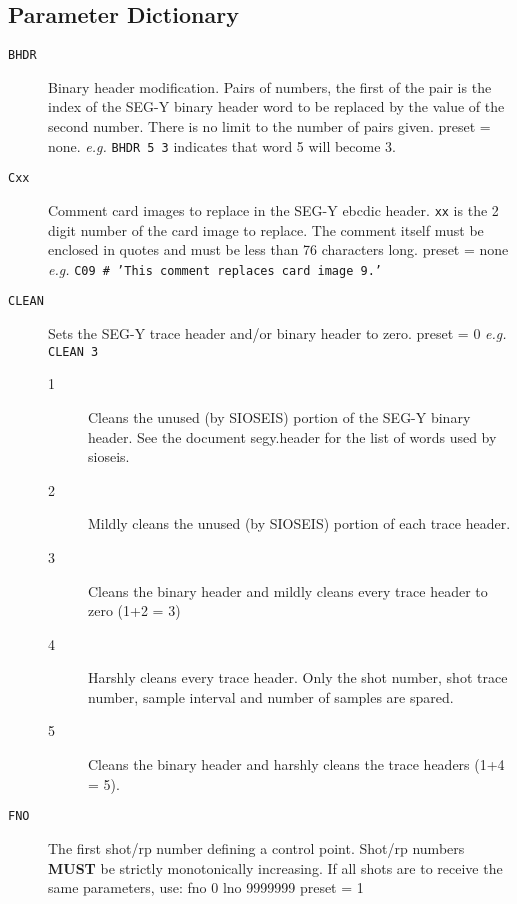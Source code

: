 \subsection{Parameter Dictionary}

\begin{description}
\item[\texttt{BHDR}] Binary header modification.  Pairs of numbers, the first of
         the pair is the index of the SEG-Y binary header word to be
         replaced by the value of the second number.  There is no
         limit to the number of pairs given.
         \Gls{preset} = none.  \textit{e.g.} \texttt{BHDR 5 3}   indicates that word 5 will become 3.

\item[\texttt{Cxx}] Comment card images to replace in the SEG-Y \gls{ebcdic} header.  \texttt{xx}
         is the 2 digit number of the card image to replace.   The
         comment itself must be enclosed in quotes and must be less than
         76 characters long.
         \Gls{preset} = none   \textit{e.g.} \texttt{C09 \# 'This comment replaces card image 9.'}

\item[\texttt{CLEAN}] Sets the SEG-Y trace header and/or binary header to zero.
         \Gls{preset} = 0  \textit{e.g.} \texttt{CLEAN 3}
\begin{description}
       \item[1] Cleans the unused (by SIOSEIS) portion of the SEG-Y binary
           header.  See the document segy.header for the list of
           words used by sioseis.
       \item[2] Mildly cleans the unused (by SIOSEIS) portion of each
           trace header.
       \item[3] Cleans the binary header and mildly cleans every trace
           header to zero (1+2 = 3)
       \item[4] Harshly cleans every trace header.  Only the \gls{shot} number,
           \gls{shot} trace number, sample interval and number of samples
           are spared.
       \item[5] Cleans the binary header and harshly cleans the trace
           headers (1+4 = 5).
\end{description}

\item[\texttt{FNO}] The first \gls{shot}/\gls{rp} number defining a control point.  Shot/\gls{rp}
         numbers \textbf{MUST} be strictly monotonically increasing.  If all
         \glspl{shot} are to receive the same parameters, use:
         fno 0 lno 9999999
         \Gls{preset} = 1


\end{description}
